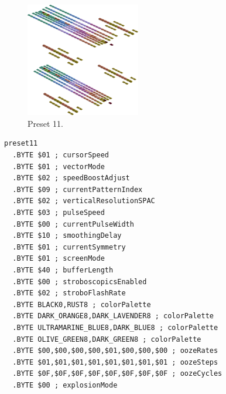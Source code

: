 \vspace*{0.5cm}
\begin{minipage}[b]{0.48\linewidth}
\begin{figure}[H]                                                          
  \centering                                                             
  \begin{adjustbox}{width=5cm,center}                                   
  \includegraphics[width=5cm]{src/colorspace_presets/preset11-45.png}%
  \end{adjustbox}                                                        
\caption*{Preset 11.}                                           
\end{figure}                                                               
\end{minipage}
\hspace{0.1cm}
\begin{minipage}[b]{0.48\linewidth}                                                                         
\begin{lstlisting}[basicstyle=\ttfamily\tiny]
preset11
  .BYTE $01 ; cursorSpeed
  .BYTE $01 ; vectorMode
  .BYTE $02 ; speedBoostAdjust
  .BYTE $09 ; currentPatternIndex
  .BYTE $02 ; verticalResolutionSPAC
  .BYTE $03 ; pulseSpeed
  .BYTE $00 ; currentPulseWidth
  .BYTE $10 ; smoothingDelay
  .BYTE $01 ; currentSymmetry
  .BYTE $01 ; screenMode
  .BYTE $40 ; bufferLength
  .BYTE $00 ; stroboscopicsEnabled
  .BYTE $02 ; stroboFlashRate
  .BYTE BLACK0,RUST8 ; colorPalette
  .BYTE DARK_ORANGE8,DARK_LAVENDER8 ; colorPalette
  .BYTE ULTRAMARINE_BLUE8,DARK_BLUE8 ; colorPalette
  .BYTE OLIVE_GREEN8,DARK_GREEN8 ; colorPalette
  .BYTE $00,$00,$00,$00,$01,$00,$00,$00 ; oozeRates
  .BYTE $01,$01,$01,$01,$01,$01,$01,$01 ; oozeSteps
  .BYTE $0F,$0F,$0F,$0F,$0F,$0F,$0F,$0F ; oozeCycles
  .BYTE $00 ; explosionMode
\end{lstlisting}
\end{minipage}
\clearpage

